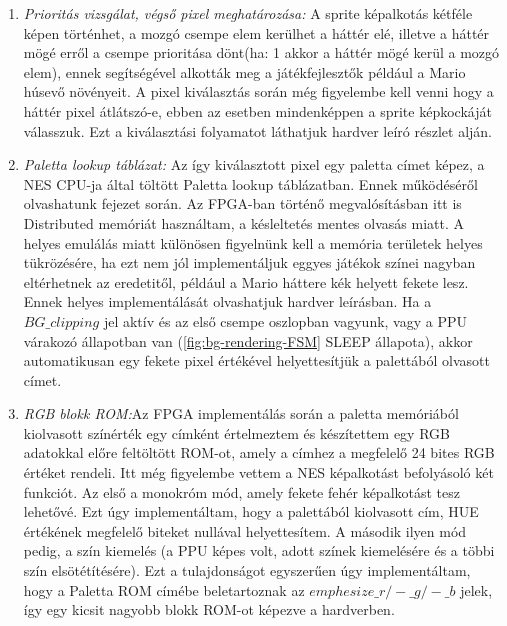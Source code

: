 	\begin{enumerate}
		\item \emph{Prioritás vizsgálat, végső pixel meghatározása:} A sprite képalkotás kétféle képen történhet, a mozgó csempe elem kerülhet a háttér elé, illetve a háttér mögé erről a csempe prioritása dönt(ha: 1 akkor a háttér mögé kerül a mozgó elem), ennek segítségével alkották meg a játékfejlesztők például a Mario húsevő növényeit. A pixel kiválasztás során még figyelembe kell venni hogy a háttér pixel átlátszó-e, ebben az esetben mindenképpen a sprite képkockáját válasszuk. Ezt a kiválasztási folyamatot láthatjuk  hardver leíró részlet alján.
		\item \emph{Paletta lookup táblázat:} Az így kiválasztott pixel egy paletta címet képez, a NES CPU-ja által töltött Paletta lookup táblázatban. Ennek működéséről olvashatunk  fejezet során. Az FPGA-ban történő megvalósításban itt is Distributed memóriát használtam, a késleltetés mentes olvasás miatt. A helyes emulálás miatt különösen figyelnünk kell a memória területek helyes tükrözésére, ha ezt nem jól implementáljuk eggyes játékok színei nagyban eltérhetnek az eredetitől, például a Mario háttere kék helyett fekete lesz. Ennek helyes implementálását olvashatjuk  hardver leírásban. Ha a $BG\_clipping$ jel aktív és az első csempe oszlopban vagyunk, vagy a PPU várakozó állapotban van (\ref{fig:bg-rendering-FSM} SLEEP állapota), akkor automatikusan egy fekete pixel értékével helyettesítjük a palettából olvasott címet.
		\item \emph{RGB blokk ROM:}Az FPGA implementálás során a paletta memóriából kiolvasott színérték egy címként értelmeztem és készítettem egy RGB adatokkal előre feltöltött ROM-ot, amely a címhez a megfelelő 24 bites RGB értéket rendeli. Itt még figyelembe vettem a NES képalkotást befolyásoló két funkciót. Az első a monokróm mód, amely fekete fehér képalkotást tesz lehetővé. Ezt úgy implementáltam, hogy a palettából kiolvasott cím, HUE értékének megfelelő biteket nullával helyettesítem. A második ilyen mód pedig, a szín kiemelés (a PPU képes volt, adott színek kiemelésére és a többi szín elsötétítésére). Ezt a tulajdonságot egyszerűen úgy implementáltam, hogy a Paletta ROM címébe beletartoznak az $emphesize\_r / -\_g / -\_b$ jelek, így egy kicsit nagyobb blokk ROM-ot képezve a hardverben.
	\end{enumerate} 
	

